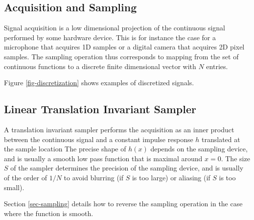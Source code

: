 


\subsection{Acquisition and Sampling}

Signal acquisition is a low dimensional projection of the continuous signal performed by some hardware device. This is for instance the case for a microphone that acquires 1D samples or a digital camera that acquires 2D pixel samples.
The sampling operation thus corresponds to mapping from the set of continuous functions to a discrete finite dimensional vector with $N$ entries.


Figure \ref{fig-discretization} shows examples of discretized signals.

\subsection{Linear Translation Invariant Sampler}

A translation invariant sampler performs the acquisition as an inner product between the continuous signal and a constant impulse response $h$ translated at the sample location
The precise shape of $h(x)$ depends on the sampling device, and is usually a smooth low pass function that is maximal around $x=0$. The size $S$ of the sampler determines the precision of the sampling device, and is usually of the order of $1/N$ to avoid blurring (if $S$ is too large) or aliasing (if $S$ is too small).

Section \ref{sec-sampling} details how to reverse the sampling operation in the case where the function is smooth.


